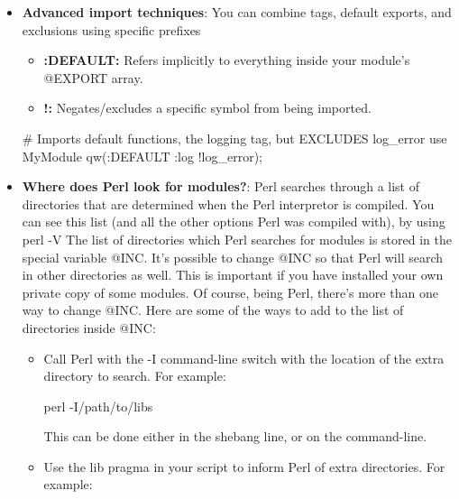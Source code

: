 \documentclass{report}
\begin{document}
\begin{itemize}
\begin{perlcode}
                create_user(); # Works!
                delete_user(); # Works!

                # log_info();  # Fails! (Not imported)
            \end{perlcode}
        \item \textbf{Advanced import techniques}: You can combine tags, default exports, and exclusions using specific prefixes
            \begin{itemize}
                \item \textbf{:DEFAULT:} Refers implicitly to everything inside your module's @EXPORT array.
                \item \textbf{!:} Negates/excludes a specific symbol from being imported.
            \end{itemize}
            \bigbreak \noindent 
            \begin{perlcode}
                # Imports default functions, the logging tag, but EXCLUDES log_error
                use MyModule qw(:DEFAULT :log !log_error); 
            \end{perlcode}
        \item \textbf{Where does Perl look for modules?}: Perl searches through a list of directories that are determined when the Perl interpretor is compiled. You can see this list (and all the other options Perl was compiled with), by using perl -V
            \bigbreak \noindent 
            The list of directories which Perl searches for modules is stored in the special variable @INC. It’s possible to change @INC so that Perl will search in other directories as well. This is important if you have installed your own private copy of some modules.
            \bigbreak \noindent 
            Of course, being Perl, there’s more than one way to change @INC. Here are some of the ways to add to the list of directories inside @INC:
            \begin{itemize}
                \item Call Perl with the -I command-line switch with the location of the extra directory to search. For example:
                \bigbreak \noindent 
                \begin{perlcode}
                    perl -I/path/to/libs
                \end{perlcode}
                \bigbreak \noindent 
                This can be done either in the shebang line, or on the command-line.
                \item Use the lib pragma in your script to inform Perl of extra directories. For example:

\end{itemize}
\end{itemize}
\end{document}

